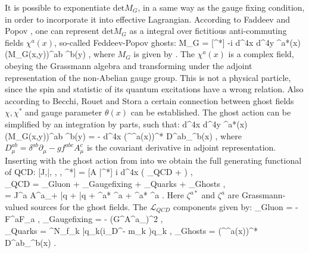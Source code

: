 	It is possible to exponentiate $\text{det} M_G$, in a same way as the gauge fixing condition, in order to incorporate it into effective Lagrangian. According to Faddeev and Popov \cite{--}, one can represent $\text{det} M_G$ as a integral over fictitious anti-commuting fields $\chi^a(x)$, so-called Feddeev-Popov ghosts:
	\beqa
	\label{qcd_low:FP_ghosts}
		 M_G = \int {} [\chi \chi^*]  \;  \left\lbrace -i \int d^4x d^4y \chi^{a*}(x) (M_G(x,y))^{ab} \chi^b(y) \right\rbrace \;,
	\eeqa
where $M_G$ is given by \Eq{\ref{qcd_low:Gauge_matrix}}. The $\chi^a(x)$ is a complex field, obeying the Grassmann algebra and transforming under the adjoint representation of the non-Abelian gauge group. This is not a physical particle, since the spin and statistic of its quantum excitations have a wrong relation. Also according to Becchi, Rouet and Stora \cite{--} a certain connection between ghost fields $\chi, \chi^*$ and gauge parameter $\theta(x)$ can be established. The ghost action can be simplified by an integration by parts, such that:
	\beqa
		\label{qcd_low:FP_ghosts_action}
		\int d^4x d^4y \chi^{a*}(x) (M_G(x,y))^{ab} \chi^b(y) = - \int d^4x (\partial^\mu \chi^a(x))^* D^{ab}_\mu \chi^b(x) \;,
	\eeqa
where $D^{ab}_\mu = \delta^{ab}\partial_\mu - gf^{abc}A^c_\mu$ is the covariant derivative in adjoint representation. Inserting \Eq{\ref{qcd_low:FP_ghosts}} with the ghost action from \Eq{\ref{qcd_low:FP_ghosts_action}} into \Eq{\ref{qcd_low:Gen_functional_vec_fer}} we obtain the full generating functional of QCD:
	\beqa
		\label{qcd_low:Gen_functional_QCD}
		[J,\bar \eta, \eta, \zeta, \zeta^*] = \int {} [A \bar \eta \eta \zeta \zeta^*] \;   \left\lbrace i \int d^4x \left( _{QCD} +  \right)  \right\rbrace \;,\; \\
	\notag	{}_{QCD} = _{Gluon} + _{Gauge\;fixing} + _{Quarks} + _{Ghosts}  \;, \;\;\;\;\;\;\;\;\;\;\; \\
	\notag {} = J^{a\mu} A^a_\mu + \bar q \eta + \bar \eta q + \chi^{a*} \zeta^a + \zeta^{a*} \chi^a \;. \;\;\;\;\;\;\;\;\;\;\;\;\;
	\eeqa
Here $\zeta^{a*}$ and $\zeta^{a}$ are Grassmann-valued sources for the ghost fields. The $\mathcal{L}_{QCD}$ components given by:
	\beqa
		_{Gluon} = - F^{a\mu\nu}F_{a\mu\nu} \;, \;\;\;\;\;\;\;\;\;\;\;\;\;\;\;\;\;\;\;\;\; _{Gauge\;fixing} = - (G^\mu A^a_\mu)^2 \;, \;\; \\
		_{Quarks} = \sum^{N_f}_k \bar{q_k}(i\gamma_\mu D^\mu - m_k )q_k \;, \;\;\;\;\; _{Ghosts} = (\partial^\mu \chi^a(x))^* D^{ab}_\mu \chi^b(x) \;.
	\eeqa
